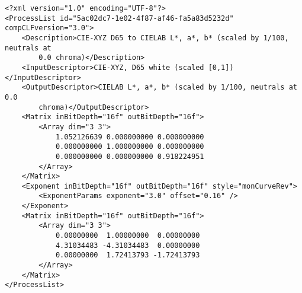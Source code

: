 \begin{lstlisting}[caption=CIE XYZ to CIELAB]
<?xml version="1.0" encoding="UTF-8"?>
<ProcessList id="5ac02dc7-1e02-4f87-af46-fa5a83d5232d" compCLFversion="3.0">
    <Description>CIE-XYZ D65 to CIELAB L*, a*, b* (scaled by 1/100, neutrals at 
        0.0 chroma)</Description>
    <InputDescriptor>CIE-XYZ, D65 white (scaled [0,1])</InputDescriptor>
    <OutputDescriptor>CIELAB L*, a*, b* (scaled by 1/100, neutrals at 0.0 
        chroma)</OutputDescriptor>
    <Matrix inBitDepth="16f" outBitDepth="16f">
        <Array dim="3 3">
            1.052126639 0.000000000 0.000000000
            0.000000000 1.000000000 0.000000000
            0.000000000 0.000000000 0.918224951
        </Array>
    </Matrix>
    <Exponent inBitDepth="16f" outBitDepth="16f" style="monCurveRev">
        <ExponentParams exponent="3.0" offset="0.16" />
    </Exponent>
    <Matrix inBitDepth="16f" outBitDepth="16f">
        <Array dim="3 3">
            0.00000000  1.00000000  0.00000000
            4.31034483 -4.31034483  0.00000000
            0.00000000  1.72413793 -1.72413793
        </Array>
    </Matrix>
</ProcessList>
\end{lstlisting}